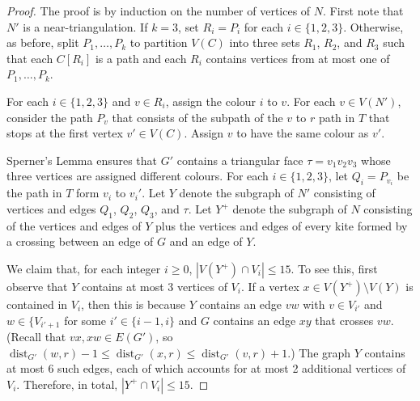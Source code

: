 \documentclass{patmorin}
\DeclareMathOperator{\dist}{dist}
\begin{document}
\begin{proof}
  The proof is by induction on the number of vertices of $N$.
  First note that $N'$ is a near-triangulation.  If $k=3$, set $R_i=P_i$ for each $i\in\{1,2,3\}$.  Otherwise, as before, split $P_1,\ldots,P_k$ to partition $V(C)$ into three sets $R_1$, $R_2$, and $R_3$ such that each $C[R_i]$ is a path and each $R_i$ contains vertices from at most one of $P_1,\ldots,P_k$. 
  
  For each $i\in\{1,2,3\}$ and $v\in R_i$, assign the colour $i$ to $v$.
  For each $v\in V(N')$, consider the path $P_v$ that consists of the subpath of the $v$ to $r$ path in $T$ that stops at the first vertex $v'\in V(C)$. Assign $v$ to have the same colour as $v'$.
  
  Sperner's Lemma ensures that $G'$ contains a triangular face $\tau=v_1v_2v_3$ whose three vertices are assigned different colours. For each $i\in\{1,2,3\}$, let $Q_i=P_{v_i}$ be the path in $T$ form $v_i$ to $v_i'$.  Let $Y$ denote the subgraph of $N'$ consisting of vertices and edges $Q_1$, $Q_2$, $Q_3$, and $\tau$.  Let $Y^+$ denote the subgraph of $N$ consisting of the vertices and edges of $Y$ plus the vertices and edges of every kite formed by a crossing between an edge of $G$ and an edge of $Y$.
  
  We claim that, for each integer $i\ge 0$, $|V(Y^+)\cap V_i|\le 15$.  To see this, first observe that $Y$ contains at most 3 vertices of $V_i$. If a vertex $x\in V(Y^+)\setminus V(Y)$ is contained in $V_i$, then this is because $Y$ contains an edge $vw$ with $v\in V_{i'}$ and $w\in\{V_{i'+1}$ for some $i'\in\{i-1,i\}$ and $G$ contains an edge $xy$ that crosses $vw$. (Recall that $vx,xw\in E(G')$, so $\dist_{G'}(w,r)-1\le\dist_{G'}(x,r)\le\dist_{G'}(v,r)+1$.)  The graph $Y$ contains at most 6 such edges, each of which accounts for at most 2 additional vertices of $V_i$.  Therefore, in total, $|Y^+\cap V_i|\le 15$.


\end{proof}
\end{document}
